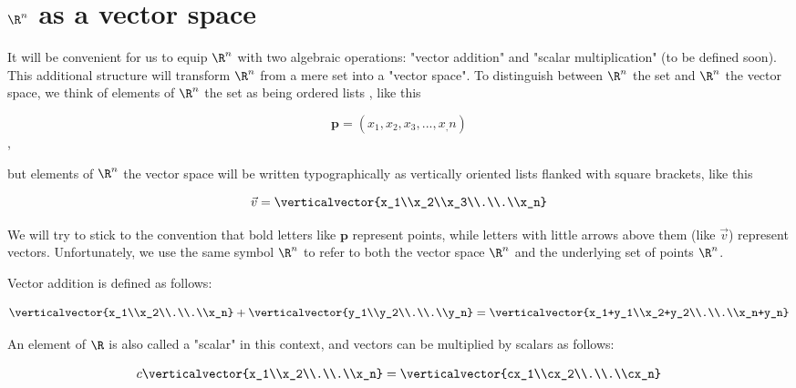 
\section{$\R^n$ as a vector space}
It will be convenient for us to equip $\R^n$ with two algebraic operations:  "vector addition" and "scalar multiplication" (to be defined soon).
This additional structure will transform $\R^n$ from a mere set into a "vector space".  To distinguish between $\R^n$ the set and $\R^n$ the vector space,
 we think of elements of $\R^n$ the set as being ordered lists , like this 
 
 \[\mathbf{p} = (x_1,x_2,x_3, ...,x_,n)\],
 
 but elements of $\R^n$ the vector space will be written typographically as vertically oriented lists flanked with square brackets, like this 
 
  \[ \vec{v}= \verticalvector{x_1\\x_2\\x_3\\.\\.\\x_n}\]
 
We will try to stick to the convention that bold letters like $\mathbf{p}$ represent points, while letters with little arrows above them (like $\vec{v}$) represent vectors. 
Unfortunately, we use the same symbol $\R^n$ to refer to both the vector space $\R^n$ and the underlying set of points $\R^n$.
 
 Vector addition is defined as follows:
 
 \[\verticalvector{x_1\\x_2\\.\\.\\x_n} +\verticalvector{y_1\\y_2\\.\\.\\y_n}=\verticalvector{x_1+y_1\\x_2+y_2\\.\\.\\x_n+y_n}\]
	 	
	An element of $\R$ is also called a "scalar" in this context, and vectors can be multiplied by scalars as follows:
	
	\[ c\verticalvector{x_1\\x_2\\.\\.\\x_n} = \verticalvector{cx_1\\cx_2\\.\\.\\cx_n} \]
 	 
